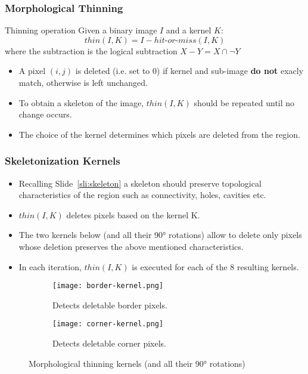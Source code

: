 \begin{frame}[c]
  \frametitle{Morphological Thinning}
  \begin{block}
    {Thinning operation}
    Given a binary image $I$ and a kernel $K$:
    \begin{equation}
      thin(I, K) = I - hit\mbox{-}or\mbox{-}miss(I, K)
    \end{equation}
    where the subtraction is the logical subtraction $X-Y = X \cap \neg Y$
  \end{block}
  \begin{itemize}
    \item A pixel $(i, j)$ is deleted (i.e. set to 0) if kernel and sub-image \textbf{do not} exacly match, otherwise is left unchanged.
    \item To obtain a skeleton of the image, $thin(I, K)$ should be repeated until no change occurs.
    \item The choice of the kernel determines which pixels are deleted from the region.
  \end{itemize}
\end{frame}

\begin{frame}
  \frametitle{Skeletonization Kernels}
  \begin{itemize}
    \item Recalling Slide~\ref{sli:skeleton} a skeleton should preserve topological characteristics of the region such as connectivity, holes, cavities etc.
    \item $thin(I, K)$ deletes pixels based on the kernel K.
    \item The two kernels below (and all their 90° rotations) allow to delete only pixels whose deletion preserves the above mentioned characteristics.
    \item In each iteration, $thin(I, K)$ is executed for each of the 8 resulting kernels.
  \end{itemize}
  \begin{figure}
    \centering
    \begin{subfigure}[b]{0.45\textwidth}
      \centering
      \texttt{[image: border-kernel.png]}
      \caption{Detects deletable border pixels.}
    \end{subfigure}
    \hfill
    \begin{subfigure}[b]{0.45\textwidth}
      \centering
      \texttt{[image: corner-kernel.png]}
      \caption{Detects deletable corner pixels.}
    \end{subfigure}
    \caption{Morphological thinning kernels (and all their 90° rotations)}
  \end{figure}
\end{frame}

